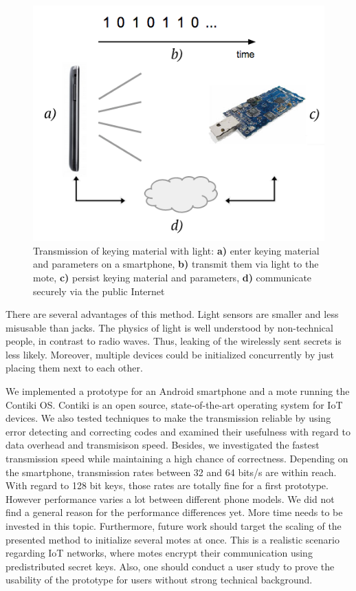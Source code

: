 \documentclass{sig-alternate} %
\begin{document}
\begin{figure}[t]
	\centering
	\includegraphics[scale=.65]{images/overview.png}
	\caption{Transmission of keying material with light: \textbf{a)} enter keying material and parameters on a smartphone, \textbf{b)} transmit them via light to the mote, \textbf{c)} persist keying material and parameters, \textbf{d)} communicate securely via the public Internet }
	\label{fig:overview}
\end{figure}
There are several advantages of this method.
Light sensors are smaller and less misusable than jacks.
The physics of light is well understood by non-technical people, in contrast to radio waves.
Thus, leaking of the wirelessly sent secrets is less likely.
Moreover, multiple devices could be initialized concurrently by just placing them next to each other.

We implemented a prototype for an Android smartphone and a mote running the Contiki OS.
Contiki is an open source, state-of-the-art operating system for IoT devices.
We also tested techniques to make the transmission reliable by using error detecting and correcting codes and examined their usefulness with regard to data overhead and transmisison speed.
Besides, we investigated the fastest transmission speed while maintaining a high chance of correctness.
Depending on the smartphone, transmission rates between 32 and 64 bits/s are within reach.
With regard to 128 bit keys, those rates are totally fine for a first prototype.
However performance varies a lot between different phone models.
We did not find a general reason for the performance differences yet.
More time needs to be invested in this topic.
Furthermore, future work should target the scaling of the presented method to initialize several motes at once.
This is a realistic scenario regarding IoT networks, where motes encrypt their communication using predistributed secret keys.
Also, one should conduct a user study to prove the usability of the prototype for users without strong technical background.
\end{document}
